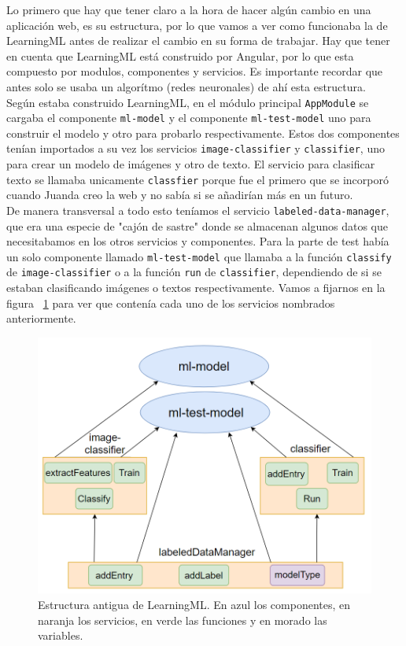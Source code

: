\documentclass[a4paper, 12pt]{book}
\begin{document}
Lo primero que hay que tener claro a la hora de hacer algún cambio en una aplicación web, es su estructura, por lo que vamos a ver como funcionaba la de LearningML antes de realizar el cambio en su forma de trabajar. Hay que tener en cuenta que LearningML está construido por Angular, por lo que esta compuesto por modulos, componentes y servicios. Es importante recordar que antes solo se usaba un algorítmo (redes neuronales) de ahí esta estructura. \\
Según estaba construido LearningML, en el módulo principal \texttt{AppModule} se cargaba el componente \texttt{ml-model} y el componente \texttt{ml-test-model} uno para construir el modelo y otro para probarlo respectivamente. Estos dos componentes tenían importados a su vez los servicios \texttt{image-classifier} y \texttt{classifier}, uno para crear un modelo de imágenes y otro de texto. El servicio para clasificar texto se llamaba unicamente \texttt{classfier} porque fue el primero que se incorporó cuando Juanda creo la web y no sabía si se añadirían más en un futuro. \\
De manera transversal a todo esto teníamos el servicio \texttt{labeled-data-manager}, que era una especie de "cajón de sastre" donde se almacenan algunos datos que necesitabamos en los otros servicios y componentes. 
Para la parte de test había un solo componente llamado \texttt{ml-test-model} que llamaba a la función \texttt{classify} de \texttt{image-classifier} o a la función  \texttt{run} de \texttt{classifier}, dependiendo de si se estaban clasificando imágenes o textos respectivamente.
Vamos a fijarnos en la figura ~\ref{fig:modeloantiguo} para ver que contenía cada uno de los servicios nombrados anteriormente.

\begin{figure}
	\centering
	\includegraphics[width=12cm, keepaspectratio]{img/modeloantiguo}
	\caption{Estructura antigua de LearningML. En azul los componentes, en naranja los servicios, en verde las funciones y en morado las variables.}				\label{fig:modeloantiguo}
\end{figure}
\end{document}
